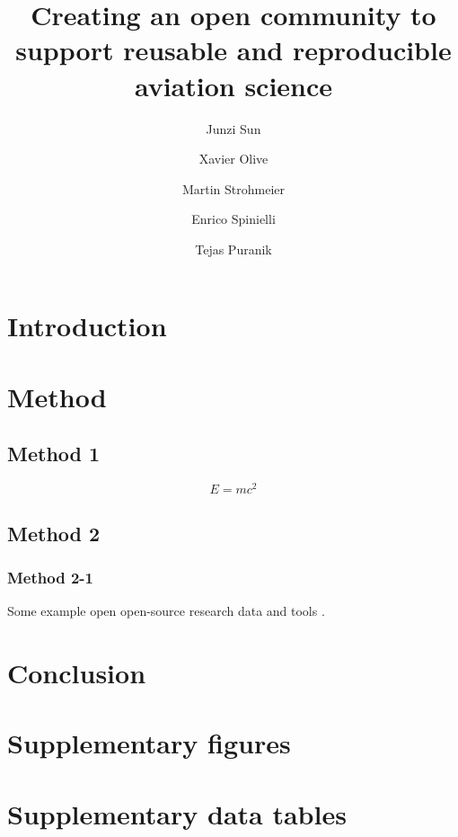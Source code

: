 \documentclass[
  manuscript=Re/Science,  %
  year=20xx,
  volume=x,
  layout=largetwo,
]{joas}
\title{Creating an open community to support reusable and reproducible aviation science}
\author{Junzi Sun}
\affiliation{Joint first authors}
\author{Xavier Olive}
\affiliation{Joint first authors}
\author{Martin Strohmeier}
\affiliation{Joint first authors}
\author{Enrico Spinielli}
\affiliation{EUROCONTROL, Belgium}
\author{Tejas Puranik}
\affiliation{NASA Ames Research Center, USA}
\begin{document}
\begin{abstract}
  \blindtext
\end{abstract}

\section{Introduction}
\Blindtext

\section{Method}

\subsection{Method 1}
\blindtext

\begin{equation}
  E = m c^2
\end{equation}

\subsection{Method 2}
\subsubsection{Method 2-1}
\blindtext

Some example open open-source research data \citep{schafer2014bringing} and tools \citep{olive2019traffic,sun2020openap}. 


\section{Conclusion}

\Blindtext


\begin{acknowledgement}
\blindtext
\end{acknowledgement}


\printbibliography

\appendix

\section{Supplementary figures}
\blindtext

\section{Supplementary data tables}
\blindtext
\end{document}
